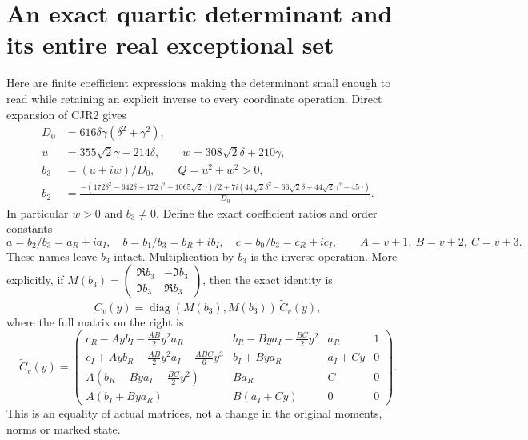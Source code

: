 \documentclass[11pt]{article}
\begin{document}
\section{An exact quartic determinant and its entire real exceptional set}
Here are finite coefficient expressions making the determinant small
enough to read while retaining an explicit inverse to every coordinate
operation. Direct expansion of CJR2 gives
\[
 \begin{split}
 D_0&=616\delta\gamma(\delta^2+\gamma^2),\\
 u&=355\sqrt2\gamma-214\delta,
 \qquad w=308\sqrt2\delta+210\gamma,\\
 b_3&=(u+iw)/D_0,\qquad Q=u^2+w^2>0,\\
 b_2&=\frac{-(172\delta^2-642\delta+172\gamma^2+
                   1065\sqrt2\gamma)/2
       +7i(44\sqrt2\delta^2-66\sqrt2\delta+
                    44\sqrt2\gamma^2-45\gamma)}{D_0}.
 \end{split}\tag{CJR6}
\]
In particular $w>0$ and $b_3\ne0$. Define the exact coefficient
ratios and order constants
\[
 a=b_2/b_3=a_R+ia_I,\quad b=b_1/b_3=b_R+ib_I,
 \quad c=b_0/b_3=c_R+ic_I,
 \qquad A=v+1,\ B=v+2,\ C=v+3.
 \tag{CJR7}
\]
These names leave $b_3$ intact. Multiplication by $b_3$ is the
inverse operation. More explicitly, if
$M(b_3)=\left(\begin{smallmatrix}\Re b_3&-\Im b_3\\
\Im b_3&\Re b_3\end{smallmatrix}\right)$, then the exact identity is
\[
 C_v(y)=\operatorname{diag}(M(b_3),M(b_3))\,\widetilde C_v(y),
 \tag{CJR8}
\]
where the full matrix on the right is
\[
\widetilde C_v(y)=
\begin{pmatrix}
 c_R-Ayb_I-\frac{AB}{2}y^2a_R&
 b_R-Bya_I-\frac{BC}{2}y^2&a_R&1\\
 c_I+Ayb_R-\frac{AB}{2}y^2a_I-\frac{ABC}{6}y^3&
 b_I+Bya_R&a_I+Cy&0\\
 A(b_R-Bya_I-\frac{BC}{2}y^2)&Ba_R&C&0\\
 A(b_I+Bya_R)&B(a_I+Cy)&0&0
\end{pmatrix}.
\tag{CJR9}
\]
This is an equality of actual matrices, not a change in the original
moments, norms or marked state.
\end{document}
